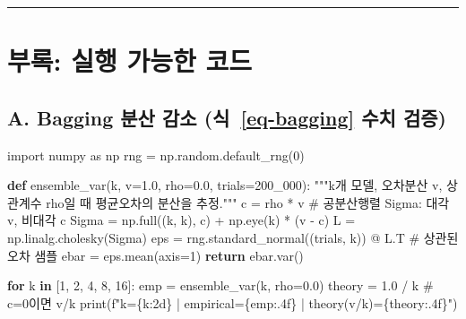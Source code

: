 \documentclass[
  letterpaper,
  DIV=11,
  numbers=noendperiod]{scrreprt}
\newenvironment{Shaded}{\begin{snugshade}}{\end{snugshade}}
\newcommand{\BuiltInTok}[1]{\textcolor[rgb]{0.00,0.23,0.31}{#1}}
\newcommand{\CommentTok}[1]{\textcolor[rgb]{0.37,0.37,0.37}{#1}}
\newcommand{\ControlFlowTok}[1]{\textcolor[rgb]{0.00,0.23,0.31}{\textbf{#1}}}
\newcommand{\DecValTok}[1]{\textcolor[rgb]{0.68,0.00,0.00}{#1}}
\newcommand{\FloatTok}[1]{\textcolor[rgb]{0.68,0.00,0.00}{#1}}
\newcommand{\ImportTok}[1]{\textcolor[rgb]{0.00,0.46,0.62}{#1}}
\newcommand{\KeywordTok}[1]{\textcolor[rgb]{0.00,0.23,0.31}{\textbf{#1}}}
\newcommand{\NormalTok}[1]{\textcolor[rgb]{0.00,0.23,0.31}{#1}}
\newcommand{\OperatorTok}[1]{\textcolor[rgb]{0.37,0.37,0.37}{#1}}
\newcommand{\SpecialCharTok}[1]{\textcolor[rgb]{0.37,0.37,0.37}{#1}}
\newcommand{\SpecialStringTok}[1]{\textcolor[rgb]{0.13,0.47,0.30}{#1}}
\begin{document}
\begin{center}\rule{0.5\linewidth}{0.5pt}\end{center}

\chapter{부록: 실행 가능한 코드}\label{sec-appendix}

\section{\texorpdfstring{A. Bagging 분산 감소 (식~\ref{eq-bagging} 수치
검증)}{A. Bagging 분산 감소 (식~ 수치 검증)}}\label{a.-bagging-uxbd84uxc0b0-uxac10uxc18c-eq-bagging-uxc218uxce58-uxac80uxc99d}

\begin{Shaded}
\begin{Highlighting}[]
\ImportTok{import}\NormalTok{ numpy }\ImportTok{as}\NormalTok{ np}
\NormalTok{rng }\OperatorTok{=}\NormalTok{ np.random.default\_rng(}\DecValTok{0}\NormalTok{)}

\KeywordTok{def}\NormalTok{ ensemble\_var(k, v}\OperatorTok{=}\FloatTok{1.0}\NormalTok{, rho}\OperatorTok{=}\FloatTok{0.0}\NormalTok{, trials}\OperatorTok{=}\DecValTok{200\_000}\NormalTok{):}
    \CommentTok{"""k개 모델, 오차분산 v, 상관계수 rho일 때 평균오차의 분산을 추정."""}
\NormalTok{    c }\OperatorTok{=}\NormalTok{ rho }\OperatorTok{*}\NormalTok{ v}
    \CommentTok{\# 공분산행렬 Sigma: 대각 v, 비대각 c}
\NormalTok{    Sigma }\OperatorTok{=}\NormalTok{ np.full((k, k), c) }\OperatorTok{+}\NormalTok{ np.eye(k) }\OperatorTok{*}\NormalTok{ (v }\OperatorTok{{-}}\NormalTok{ c)}
\NormalTok{    L }\OperatorTok{=}\NormalTok{ np.linalg.cholesky(Sigma)}
\NormalTok{    eps }\OperatorTok{=}\NormalTok{ rng.standard\_normal((trials, k)) }\OperatorTok{@}\NormalTok{ L.T   }\CommentTok{\# 상관된 오차 샘플}
\NormalTok{    ebar }\OperatorTok{=}\NormalTok{ eps.mean(axis}\OperatorTok{=}\DecValTok{1}\NormalTok{)}
    \ControlFlowTok{return}\NormalTok{ ebar.var()}

\ControlFlowTok{for}\NormalTok{ k }\KeywordTok{in}\NormalTok{ [}\DecValTok{1}\NormalTok{, }\DecValTok{2}\NormalTok{, }\DecValTok{4}\NormalTok{, }\DecValTok{8}\NormalTok{, }\DecValTok{16}\NormalTok{]:}
\NormalTok{    emp }\OperatorTok{=}\NormalTok{ ensemble\_var(k, rho}\OperatorTok{=}\FloatTok{0.0}\NormalTok{)}
\NormalTok{    theory }\OperatorTok{=} \FloatTok{1.0} \OperatorTok{/}\NormalTok{ k            }\CommentTok{\# c=0이면 v/k}
    \BuiltInTok{print}\NormalTok{(}\SpecialStringTok{f"k=}\SpecialCharTok{\{}\NormalTok{k}\SpecialCharTok{:2d\}}\SpecialStringTok{ | empirical=}\SpecialCharTok{\{}\NormalTok{emp}\SpecialCharTok{:.4f\}}\SpecialStringTok{ | theory(v/k)=}\SpecialCharTok{\{}\NormalTok{theory}\SpecialCharTok{:.4f\}}\SpecialStringTok{"}\NormalTok{)}
\end{Highlighting}
\end{Shaded}
\end{document}
